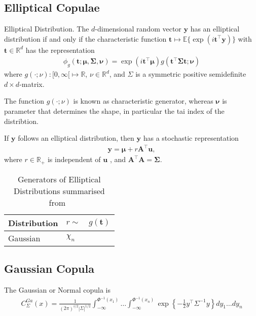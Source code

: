 \subsection{Elliptical Copulae}\label{subsec:elliptical-copulae}

\begin{definition}
    Elliptical Distribution.
    The $d$-dimensional random vector $\pmb{y}$ has an elliptical distribution if and only if the characteristic function
    $\pmb{t} \mapsto \mathbb{E}\{\exp(i\pmb{t}^\top \pmb{y})\}$ with $\pmb{t} \in \mathbb{R}^d$ has the representation
    \begin{align}
        \phi_g(\pmb{t}; \pmb{\mu}, \pmb{\Sigma}, \pmb{\nu}) = \exp(i\pmb{t}^\top\pmb{\mu})g(\pmb{t}^\top\pmb{\Sigma}\pmb{t};\pmb{\nu})
        \end{align}
    where $g(\cdot;\nu):[0, \infty[ \mapsto \mathbb{R}$, $\nu \in \mathbb{R}^d$, and $\Sigma$ is a symmetric positive semidefinite $d\times d$-matrix.
    \end{definition}

The function $g(\cdot; \nu)$ is known as characteristic generator, whereas $\pmb{\nu}$ is parameter that determines the shape, in particular the tai index of the distribtion.

\begin{corollary} \citep[equation 2.12]{fang2018symmetric}
    If $\pmb{y}$ follows an elliptical distribution, then $\pmb{y}$ has a stochastic representation
    \begin{align}\label{eq:stochastic-representation}
        \pmb{y} = \pmb{\mu} + r\pmb{A}^\top \pmb{u},
        \end{align}
    where $r \in \mathbb{R}_+$ is independent of
    $\pmb{u}$
    , and $\pmb{A}^\top\pmb{A}=\pmb{\Sigma}$.
    \end{corollary}

\begin{table}[ht]
    \center
    \begin{tabular}{lll}
    Distribution & $r \sim$ & $g(\pmb{t})$\\ \hline
    Gaussian & $\chi_n$ &
        \end{tabular}
    \caption{Generators of Elliptical Distributions summarised from~\cite[Chapter 2]{fang2018symmetric}}
    \label{tab:table}
\end{table}


\subsection{Gaussian Copula}\label{subsec:Gaussian-copula}
The Gaussian or Normal copula is
\begin{align}
    C^{Ga}_\Sigma(x) = \frac{1}{(2\pi)^{i/2} |\Sigma|^{1/2}}
    \int_{-\infty}^{\Phi^{-1}(x_1)} \dots \int_{-\infty}^{\Phi^{-1}(x_n)}
    \exp \left\{
    -\frac{1}{2}y^\top \Sigma^{-1}y
    \right\}
    dy_1 \dots dy_n
    \end{align}

